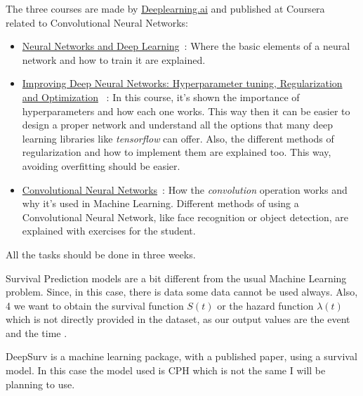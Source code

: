 The three courses are made by \href{https://www.deeplearning.ai}{Deeplearning.ai}
and published at Coursera~\cite{neural:coursera} related to Convolutional Neural Networks:
\begin{itemize}
  \item \href{https://www.coursera.org/learn/neural-networks-deep-learning}{Neural Networks and 
    Deep Learning}~\cite{neural:coursera:nn}: Where the basic elements of a neural network and how
    to train it are explained.

  \item \href{https://www.coursera.org/learn/deep-neural-network}{Improving Deep Neural Networks: 
    Hyperparameter tuning, Regularization and Optimization}
    ~\cite{neural:coursera:nn-hyperparameters}: 
    In this course, it's shown the importance of hyperparameters and how each one works. 
    This way then it can be easier to design a proper network and understand all the options that
    many deep learning libraries like \emph{tensorflow} can offer. Also, the different methods 
    of regularization and how to implement them are explained too. This way, avoiding overfitting
    should be easier.

  \item \href{https://www.coursera.org/learn/convolutional-neural-networks}{Convolutional Neural 
    Networks}~\cite{neural:coursera:cnn}:
    How the \emph{convolution} operation works and why it's used in Machine Learning. 
    Different methods of using a Convolutional Neural Network, like face recognition or 
    object detection, are explained with exercises for the student.
\end{itemize}

All the tasks should be done in three weeks.


Survival Prediction models are a bit different from the usual Machine Learning problem. Since, 
in this case, there is  data some data cannot be used always. Also, 4
we want to obtain the survival function \( S(t) \) or the hazard function \( \lambda(t) \) 
which is not directly provided in the dataset, as our output values are the \gls{event} 
 and the \gls{time} .

DeepSurv is a machine learning package, with a published paper, using a survival model. In this
case the model used is \gls{CPH} which is not the same I will be planning to use.

